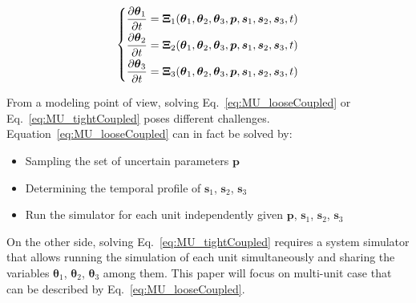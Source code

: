 \begin{equation}
  \begin{matrix}
     \begin{dcases*}
       \frac{\partial \boldsymbol{\theta}_1}{\partial t}  = \boldsymbol{\Xi}_1 (\boldsymbol{\theta}_1 , \boldsymbol{\theta}_2, \boldsymbol{\theta}_3 , \boldsymbol p, \boldsymbol{s}_1 ,
       \boldsymbol{s}_2 , \boldsymbol{s}_3, t)  \\
       \frac{\partial \boldsymbol{\theta}_2}{\partial t}  = \boldsymbol{\Xi}_2 (\boldsymbol{\theta}_1 , \boldsymbol{\theta}_2, \boldsymbol{\theta}_3 , \boldsymbol p, \boldsymbol{s}_1 ,
       \boldsymbol{s}_2 , \boldsymbol{s}_3, t)  \\
       \frac{\partial \boldsymbol{\theta}_3}{\partial t}  = \boldsymbol{\Xi}_3 (\boldsymbol{\theta}_1 , \boldsymbol{\theta}_2, \boldsymbol{\theta}_3 , \boldsymbol p, \boldsymbol{s}_1 ,
       \boldsymbol{s}_2 , \boldsymbol{s}_3, t)  \\
     \end{dcases*}
  \end{matrix}
  \label{eq:MU_tightCoupled}
\end{equation}

From a modeling point of view, solving Eq.~\ref{eq:MU_looseCoupled} or Eq.~\ref{eq:MU_tightCoupled} poses 
different challenges. Equation~\ref{eq:MU_looseCoupled} can in fact be solved by:
\begin{itemize}
  \item Sampling the set of uncertain parameters $\boldsymbol p$
  \item Determining the temporal profile of $\boldsymbol{s}_1$, $\boldsymbol{s}_2$, $\boldsymbol{s}_3$
  \item Run the simulator for each unit independently given $\boldsymbol p$, $\boldsymbol{s}_1$, $\boldsymbol{s}_2$, $\boldsymbol{s}_3$
\end{itemize}

On the other side, solving Eq.~\ref{eq:MU_tightCoupled} requires a system simulator that allows 
running the simulation of each unit simultaneously and sharing the variables
$\boldsymbol{\theta}_1$, $\boldsymbol{\theta}_2$, $\boldsymbol{\theta}_3$ among them.
This paper will focus on multi-unit case that can be described by Eq.~\ref{eq:MU_looseCoupled}. 



